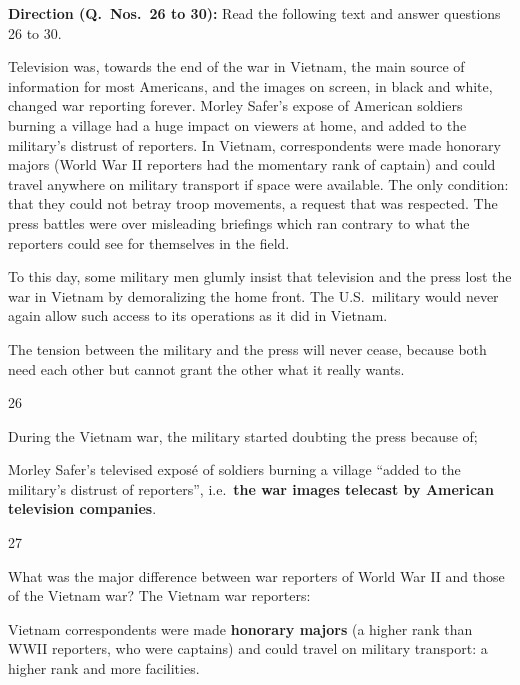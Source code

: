 \begin{context}
\textbf{Direction (Q.~Nos.~26 to 30):} Read the following text and answer questions 26 to 30.\par\smallskip
Television was, towards the end of the war in Vietnam, the main source of information for most Americans, and the images on screen, in black and white, changed war reporting forever. Morley Safer's expose of American soldiers burning a village had a huge impact on viewers at home, and added to the military's distrust of reporters. In Vietnam, correspondents were made honorary majors (World War II reporters had the momentary rank of captain) and could travel anywhere on military transport if space were available. The only condition: that they could not betray troop movements, a request that was respected. The press battles were over misleading briefings which ran contrary to what the reporters could see for themselves in the field.

To this day, some military men glumly insist that television and the press lost the war in Vietnam by demoralizing the home front. The U.S.\ military would never again allow such access to its operations as it did in Vietnam.

The tension between the military and the press will never cease, because both need each other but cannot grant the other what it really wants.
\end{context}
\begin{question}{26}
{During the Vietnam war, the military started doubting the press because of;\par}
\begin{explain}
Morley Safer's televised exposé of soldiers burning a village ``added to the military's distrust of reporters'', i.e.\ \textbf{the war images telecast by American television companies}.
\end{explain}
\end{question}

\begin{question}{27}
{What was the major difference between war reporters of World War II and those of the Vietnam war? The Vietnam war reporters:\par}
\begin{explain}
Vietnam correspondents were made \textbf{honorary majors} (a higher rank than WWII reporters, who were captains) and could travel on military transport: a higher rank and more facilities.
\end{explain}
\end{question}

